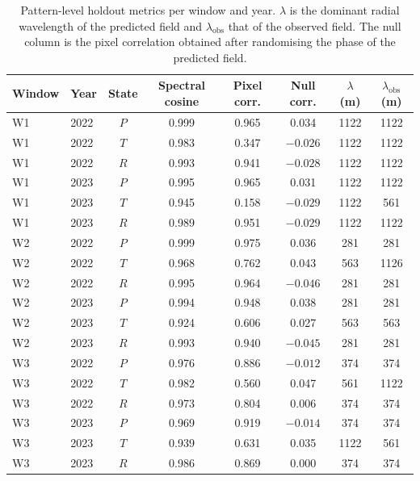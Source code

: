 \documentclass[12pt,a4paper]{article}
\begin{document}
\begin{table}[H]
	\centering
	\caption{Pattern-level holdout metrics per window and year. $\lambda$ is the dominant radial wavelength of the predicted field and $\lambda_{\mathrm{obs}}$ that of the observed field. The null column is the pixel correlation obtained after randomising the phase of the predicted field.}
	\label{tab:s9_pattern}
	\small
	\setlength{\tabcolsep}{4pt}
	\begin{tabular}{llcccccc}
		\toprule
		Window & Year & State & Spectral cosine & Pixel corr. & Null corr. & $\lambda$ (m) & $\lambda_{\mathrm{obs}}$ (m) \\
		\midrule
		W1 & 2022 & $P$ & 0.999 & 0.965 & 0.034 & 1122 & 1122 \\
		W1 & 2022 & $T$ & 0.983 & 0.347 & $-0.026$ & 1122 & 1122 \\
		W1 & 2022 & $R$ & 0.993 & 0.941 & $-0.028$ & 1122 & 1122 \\
		W1 & 2023 & $P$ & 0.995 & 0.965 & 0.031 & 1122 & 1122 \\
		W1 & 2023 & $T$ & 0.945 & 0.158 & $-0.029$ & 1122 & 561 \\
		W1 & 2023 & $R$ & 0.989 & 0.951 & $-0.029$ & 1122 & 1122 \\
		\midrule
		W2 & 2022 & $P$ & 0.999 & 0.975 & 0.036 & 281 & 281 \\
		W2 & 2022 & $T$ & 0.968 & 0.762 & 0.043 & 563 & 1126 \\
		W2 & 2022 & $R$ & 0.995 & 0.964 & $-0.046$ & 281 & 281 \\
		W2 & 2023 & $P$ & 0.994 & 0.948 & 0.038 & 281 & 281 \\
		W2 & 2023 & $T$ & 0.924 & 0.606 & 0.027 & 563 & 563 \\
		W2 & 2023 & $R$ & 0.993 & 0.940 & $-0.045$ & 281 & 281 \\
		\midrule
		W3 & 2022 & $P$ & 0.976 & 0.886 & $-0.012$ & 374 & 374 \\
		W3 & 2022 & $T$ & 0.982 & 0.560 & 0.047 & 561 & 1122 \\
		W3 & 2022 & $R$ & 0.973 & 0.804 & 0.006 & 374 & 374 \\
		W3 & 2023 & $P$ & 0.969 & 0.919 & $-0.014$ & 374 & 374 \\
		W3 & 2023 & $T$ & 0.939 & 0.631 & 0.035 & 1122 & 561 \\
		W3 & 2023 & $R$ & 0.986 & 0.869 & 0.000 & 374 & 374 \\
		\bottomrule
	\end{tabular}
\end{table}
\end{document}
